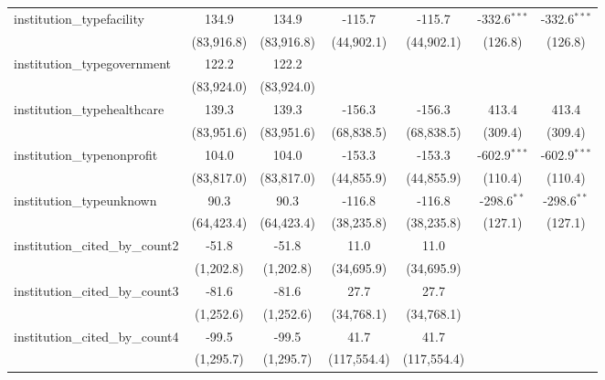 \begin{tabular}{lcccccc}
   institution\_typefacility             & 134.9        & 134.9        & -115.7      & -115.7      & -332.6$^{***}$ & -332.6$^{***}$\\   
                                         & (83,916.8)   & (83,916.8)   & (44,902.1)  & (44,902.1)  & (126.8)        & (126.8)\\   
   institution\_typegovernment           & 122.2        & 122.2        &             &             &                &   \\   
                                         & (83,924.0)   & (83,924.0)   &             &             &                &   \\   
   institution\_typehealthcare           & 139.3        & 139.3        & -156.3      & -156.3      & 413.4          & 413.4\\   
                                         & (83,951.6)   & (83,951.6)   & (68,838.5)  & (68,838.5)  & (309.4)        & (309.4)\\   
   institution\_typenonprofit            & 104.0        & 104.0        & -153.3      & -153.3      & -602.9$^{***}$ & -602.9$^{***}$\\   
                                         & (83,817.0)   & (83,817.0)   & (44,855.9)  & (44,855.9)  & (110.4)        & (110.4)\\   
   institution\_typeunknown              & 90.3         & 90.3         & -116.8      & -116.8      & -298.6$^{**}$  & -298.6$^{**}$\\   
                                         & (64,423.4)   & (64,423.4)   & (38,235.8)  & (38,235.8)  & (127.1)        & (127.1)\\   
   institution\_cited\_by\_count2        & -51.8        & -51.8        & 11.0        & 11.0        &                &   \\   
                                         & (1,202.8)    & (1,202.8)    & (34,695.9)  & (34,695.9)  &                &   \\   
   institution\_cited\_by\_count3        & -81.6        & -81.6        & 27.7        & 27.7        &                &   \\   
                                         & (1,252.6)    & (1,252.6)    & (34,768.1)  & (34,768.1)  &                &   \\   
   institution\_cited\_by\_count4        & -99.5        & -99.5        & 41.7        & 41.7        &                &   \\   
                                         & (1,295.7)    & (1,295.7)    & (117,554.4) & (117,554.4) &                &   \\   

\end{tabular}

